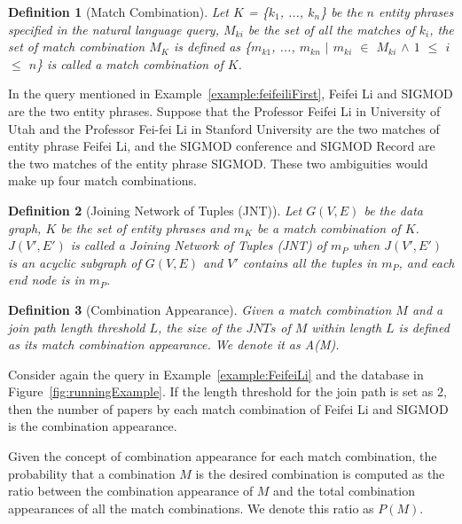 \documentclass{vldb}
\newtheorem{definition}{Definition}
\begin{document}
\begin{definition}[Match Combination]
Let $K$ = \{$k_1$, ..., $k_n$\} be the $n$ entity phrases specified in the natural language query, $M_{ki}$ be the set of all the matches of $k_i$, the set of match combination $M_K$ is defined as \{$m_{k1}$, ..., $m_{kn}$ $|$ $m_{ki}$ $\in$ $M_{ki}$ $\land$ $1$ $\leq$ $i$ $\leq$ $n$\} is called a match combination of $K$.  
\end{definition}

In the query mentioned in Example~\ref{example:feifeiliFirst}, Feifei Li and SIGMOD are the two entity phrases.  Suppose that the Professor Feifei Li in University of Utah and the Professor Fei-fei Li in Stanford University are the two matches of entity phrase Feifei Li, and the SIGMOD conference and SIGMOD Record are the two matches of the entity phrase SIGMOD.  These two ambiguities would make up four match combinations.  

\begin{definition}[Joining Network of Tuples (JNT)]
Let $G(V, E)$ be the data graph, $K$ be the set of entity phrases and $m_K$ be a match combination of $K$.  $J(V', E')$ is called a Joining Network of Tuples (JNT) of $m_P$ when $J(V', E')$ is an acyclic subgraph of $G(V, E)$ and $V'$ contains all the tuples in $m_P$, and each end node is in $m_P$.  
\end{definition}

\begin{definition}[Combination Appearance]
Given a match combination $M$ and a join path length threshold $L$, the size of the $JNTs$ of $M$ within length $L$ is defined as its match combination appearance.  We denote it as A(M).   
\end{definition}

Consider again the query in Example~\ref{example:FeifeiLi} and the database in Figure~\ref{fig:runningExample}.  If the length threshold for the join path is set as 2, then the number of papers by each match combination of Feifei Li and SIGMOD is the combination appearance.  

Given the concept of combination appearance for each match combination, the probability that a combination $M$ is the desired combination is computed as the ratio between the combination appearance of $M$ and the total combination appearances of all the match combinations.  We denote this ratio as $P(M)$.  
\end{document}

